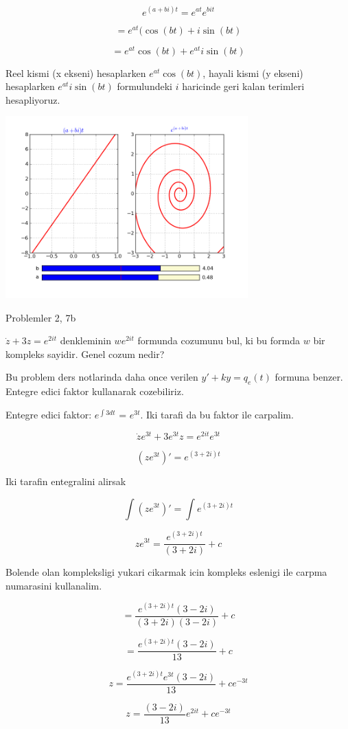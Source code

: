 \documentclass[12pt,fleqn]{article}\usepackage{../common}
\begin{document}
\[ e^{(a+bi)t} = e^{at} e^{bit}\]

\[ = e^{at} (\cos(bt) + i\sin(bt) \]

\[ = e^{at}\cos(bt) + e^{at} i\sin(bt) \]

Reel kismi (x ekseni) hesaplarken $e^{at}\cos(bt)$, hayali kismi (y ekseni)
hesaplarken $e^{at} i\sin(bt)$ formulundeki $i$ haricinde geri kalan terimleri
hesapliyoruz.



\includegraphics[height=7cm]{compexp.png}

Problemler 2, 7b

$\dot{z} + 3z = e^{2it}$ denkleminin $we^{2it}$ formunda cozumunu bul, ki
bu formda $w$ bir kompleks sayidir. Genel cozum nedir? 

Bu problem ders notlarinda daha once verilen $y' + ky = q_e(t)$ formuna
benzer. Entegre edici faktor kullanarak cozebiliriz. 

Entegre edici faktor: $e^{\int 3 dt}$ = $e^{3t}$. Iki tarafi da bu faktor
ile carpalim. 

\[ \dot{z}e^{3t} + 3e^{3t}z = e^{2it}e^{3t} \]

\[ (ze^{3t})' = e^{(3+2i)t} \]

Iki tarafin entegralini alirsak

\[ \int (ze^{3t})' = \int e^{(3+2i)t} \]

\[ ze^{3t} =  \frac {e^{(3+2i)t}}{(3+2i)} + c\]

Bolende olan kompleksligi yukari cikarmak icin kompleks eslenigi ile
carpma numarasini kullanalim. 

\[ =  \frac {e^{(3+2i)t}(3-2i)}{(3+2i)(3-2i)} + c\]

\[ =  \frac {e^{(3+2i)t}(3-2i)}{13} + c\]

\[ z =  \frac {e^{(3+2i)t}e^{3t}(3-2i)}{13} + c e^{-3t}\]

\[ z = \frac {(3-2i)}{13} e^{2it} + c e^{-3t}\]
\end{document}
